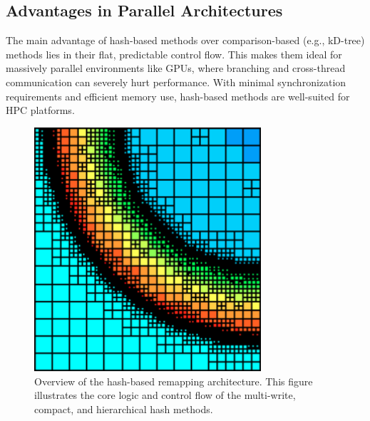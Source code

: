 \subsection{Advantages in Parallel Architectures}

The main advantage of hash-based methods over comparison-based (e.g., kD-tree) methods lies in their flat, predictable control flow. This makes them ideal for massively parallel environments like GPUs, where branching and cross-thread communication can severely hurt performance. With minimal synchronization requirements and efficient memory use, hash-based methods are well-suited for HPC platforms.

\begin{figure}[h]
  \centering
  \includegraphics[width=0.75\textwidth]{./images/figure_p4_1.png}
  \caption{Overview of the hash-based remapping architecture. This figure illustrates the core logic and control flow of the multi-write, compact, and hierarchical hash methods.}
  \label{fig:hash_architecture}
\end{figure}

